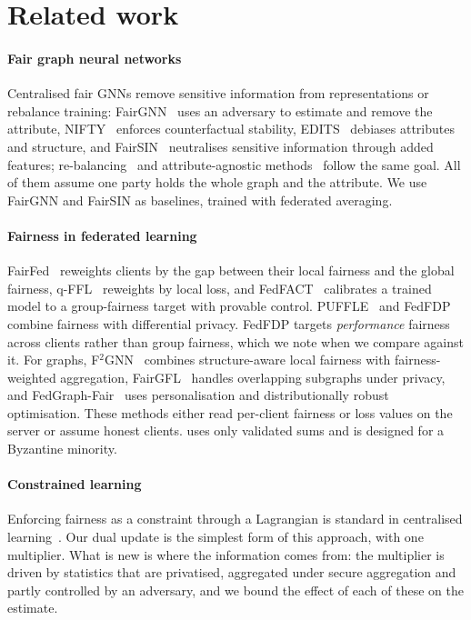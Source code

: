 \section{Related work}\label{sec:related}

\paragraph{Fair graph neural networks}
Centralised fair GNNs remove sensitive information from representations or rebalance training: FairGNN~\citep{dai2021say} uses an adversary to estimate and remove the attribute, NIFTY~\citep{agarwal2021towards} enforces counterfactual stability, EDITS~\citep{dong2022edits} debiases attributes and structure, and FairSIN~\citep{yang2024fairsin} neutralises sensitive information through added features; re-balancing~\citep{li2024fairgb} and attribute-agnostic methods~\citep{zhu2024fairinv} follow the same goal. All of them assume one party holds the whole graph and the attribute. We use FairGNN and FairSIN as baselines, trained with federated averaging.

\paragraph{Fairness in federated learning}
FairFed~\citep{ezzeldin2023fairfed} reweights clients by the gap between their local fairness and the global fairness, q-FFL~\citep{li2020fair} reweights by local loss, and FedFACT~\citep{fedfact2025} calibrates a trained model to a group-fairness target with provable control. PUFFLE~\citep{corbucci2024puffle} and FedFDP~\citep{ling2024feddp} combine fairness with differential privacy. FedFDP targets \emph{performance} fairness across clients rather than group fairness, which we note when we compare against it. For graphs, F$^2$GNN~\citep{f2gnn2023} combines structure-aware local fairness with fairness-weighted aggregation, FairGFL~\citep{fairgfl2026} handles overlapping subgraphs under privacy, and FedGraph-Fair~\citep{fedgraphfair2026} uses personalisation and distributionally robust optimisation. These methods either read per-client fairness or loss values on the server or assume honest clients. \clamp{} uses only validated sums and is designed for a Byzantine minority.

\paragraph{Constrained learning}
Enforcing fairness as a constraint through a Lagrangian is standard in centralised learning~\citep{cotter2019optimization}. Our dual update is the simplest form of this approach, with one multiplier. What is new is where the information comes from: the multiplier is driven by statistics that are privatised, aggregated under secure aggregation and partly controlled by an adversary, and we bound the effect of each of these on the estimate.

